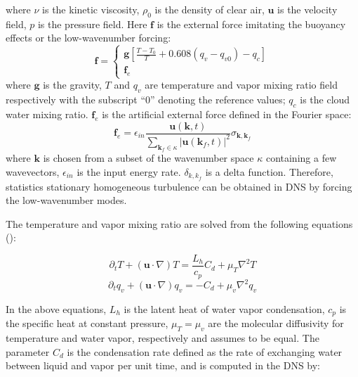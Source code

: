 \documentclass[12pt]{article}
\begin{document}
where $\nu$ is the kinetic viscosity, $\rho_{0}$ is the density of
clear air, $\mathbf{u}$ is the velocity field, $p$ is the pressure field. Here $\mathbf{f}$ is the external force imitating the buoyancy effects or the low-wavenumber forcing:
\begin{equation}
\mathbf{f}= \left\{ 
\begin{array}{l}
\mathbf{g}[\frac{T-T_{0}}{T}+0.608(q_{v}-q_{v0})-q_{c}]\\
\mathbf{f}_e
\end{array} 
\right.
\end{equation}
where $\mathbf{g}$ is the gravity, $T$ and $q_{v}$ are temperature
and vapor mixing ratio field respectively with the subscript ``$0$''
denoting the reference values; $q_{c}$ is the cloud water mixing
ratio. $\mathbf{f}_e$ is the artificial external force defined in the Fourier space:
\begin{equation}
\mathbf{f}_e = \epsilon_{in}\frac{\mathbf{u}(\mathbf{k},t)}
{\sum_{\mathbf{k}_f\in \kappa}|\mathbf{u}(\mathbf{k}_f,t)|^2}
\sigma_{\mathbf{k},\mathbf{k}_f}
\end{equation}
where $\mathbf{k}$ is chosen from a subset of the wavenumber space $\kappa$ containing a few wavevectors, $\epsilon_{in}$ is the input energy rate. $\delta_{k,k_f}$ is a delta function. Therefore, statistics stationary homogeneous turbulence 
can be obtained in DNS by forcing the low-wavenumber modes.

The temperature and vapor mixing ratio are solved from the following
equations (\cite{Kumar11}):

\begin{equation}
\partial_{t}T+(\mathbf{u}\cdot\nabla)T=\frac{L_{h}}{c_{p}}C_{d}+\mu_{T}\nabla^{2}T\label{eq:Temp}
\end{equation}
\begin{equation}
\partial_{t}q_{v}+(\mathbf{u}\cdot\nabla)q_{v}=-C_{d}+\mu_{v}\nabla^{2}q_{v}\label{eq:Vapor}
\end{equation}


In the above equations, $L_{h}$ is the latent heat of water vapor condensation,
$c_{p}$ is the specific heat at constant pressure, $\mu_{T}=\mu_{v}$ are
the molecular diffusivity for temperature and water vapor, respectively
and assumes to be equal. The parameter $C_{d}$ is the condensation
rate defined as the rate of exchanging water between liquid and vapor
per unit time, and is computed in the DNS by:
\end{document}
